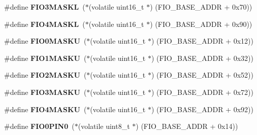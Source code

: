 \begin{DoxyCompactItemize}
\item 
\mbox{\label{group__lpc24xx__regs_gadca51b0d62b6b4fb0f91f7172babb516}} 
\#define {\bfseries F\+I\+O3\+M\+A\+S\+KL}~($\ast$(volatile uint16\+\_\+t $\ast$) (F\+I\+O\+\_\+\+B\+A\+S\+E\+\_\+\+A\+D\+DR + 0x70))
\item 
\mbox{\label{group__lpc24xx__regs_gacf67278600b239c3841be08d1ce56286}} 
\#define {\bfseries F\+I\+O4\+M\+A\+S\+KL}~($\ast$(volatile uint16\+\_\+t $\ast$) (F\+I\+O\+\_\+\+B\+A\+S\+E\+\_\+\+A\+D\+DR + 0x90))
\item 
\mbox{\label{group__lpc24xx__regs_ga099712b2e0a8661f3fd06310ca74313f}} 
\#define {\bfseries F\+I\+O0\+M\+A\+S\+KU}~($\ast$(volatile uint16\+\_\+t $\ast$) (F\+I\+O\+\_\+\+B\+A\+S\+E\+\_\+\+A\+D\+DR + 0x12))
\item 
\mbox{\label{group__lpc24xx__regs_ga15ed1c7f79c21c0c9db2dc71da3f8b3b}} 
\#define {\bfseries F\+I\+O1\+M\+A\+S\+KU}~($\ast$(volatile uint16\+\_\+t $\ast$) (F\+I\+O\+\_\+\+B\+A\+S\+E\+\_\+\+A\+D\+DR + 0x32))
\item 
\mbox{\label{group__lpc24xx__regs_ga5078582ad6743fcbded1bf4537f937b8}} 
\#define {\bfseries F\+I\+O2\+M\+A\+S\+KU}~($\ast$(volatile uint16\+\_\+t $\ast$) (F\+I\+O\+\_\+\+B\+A\+S\+E\+\_\+\+A\+D\+DR + 0x52))
\item 
\mbox{\label{group__lpc24xx__regs_ga29b027901c8512e37e771d871834bbb6}} 
\#define {\bfseries F\+I\+O3\+M\+A\+S\+KU}~($\ast$(volatile uint16\+\_\+t $\ast$) (F\+I\+O\+\_\+\+B\+A\+S\+E\+\_\+\+A\+D\+DR + 0x72))
\item 
\mbox{\label{group__lpc24xx__regs_gabd33338c48984ab9b9292dc3ff7ecc3f}} 
\#define {\bfseries F\+I\+O4\+M\+A\+S\+KU}~($\ast$(volatile uint16\+\_\+t $\ast$) (F\+I\+O\+\_\+\+B\+A\+S\+E\+\_\+\+A\+D\+DR + 0x92))
\item 
\mbox{\label{group__lpc24xx__regs_gaa3e502e416ce05215b358f63a6350458}} 
\#define {\bfseries F\+I\+O0\+P\+I\+N0}~($\ast$(volatile uint8\+\_\+t $\ast$) (F\+I\+O\+\_\+\+B\+A\+S\+E\+\_\+\+A\+D\+DR + 0x14))
\item 

\end{DoxyCompactItemize}
